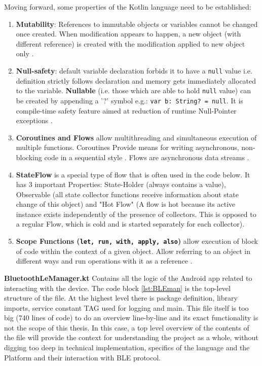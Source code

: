 Moving forward, some properties of the Kotlin language need to be established:
\begin{enumerate}
	\item \textbf{Mutability}: References to immutable objects or variables cannot be changed once created. When modification appears to happen, a new object (with different reference) is created with the modification applied to new object only \cite{kotlin_variables} \cite{kotlin_collections}.
	\item \textbf{Null-safety}: default variable declaration forbids it to have a \texttt{null} value i.e. definition strictly follows declaration and memory gets immediately allocated to the variable. \textbf{Nullable} (i.e. those which are able to hold \texttt{null} value) can be created by appending a '?' symbol e.g.: \texttt{var b: String? = null}. It is  compile-time safety feature aimed at reduction of runtime Null-Pointer exceptions \cite{kotlin_null_safety}.
	\item \textbf{Coroutines and Flows} allow multithreading and simultaneous execution of multiple functions. Coroutines Provide means for writing asynchronous, non-blocking code in a sequential style \cite{kotlin_coroutines}. Flows are asynchronous data streams \cite{kotlin_flow}. 
	\item \textbf{StateFlow} is a special type of flow that is often used in the code below. It has 3 important Properties: State-Holder (always contains a value), Observable (all state collector functions receive information about state change of this object) and "Hot Flow" (A flow is hot because its active instance exists independently of the presence of collectors. This is opposed to a regular Flow, which is cold and is started separately for each collector)\cite{jetbrains_stateflow}.
	\item \textbf{Scope Functions (\texttt{let, run, with, apply, also})} allow execution of block of code within the context of a given object. Allow referring to an object in different ways and run operations with it as a reference \cite{kotlin_scope_functions}.
\end{enumerate}

\textbf{BluetoothLeManager.kt} Contains all the logic of the Android app related to interacting with the device. The code block \ref{lst:BLEman} is the top-level structure of the file. At the highest level there is package definition, library imports, service constant TAG used for logging and main. This file itself is too big (740 lines of code) to do an overview line-by-line and its exact functionality is not the scope of this thesis. In this case, a top level overview of the contents of the file will provide the context for understanding the project as a whole, without digging too deep in technical implementation, specifics of the language and the Platform and their interaction with \ac{BLE} protocol.

